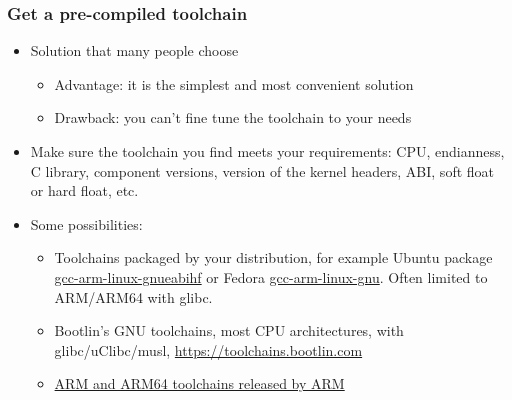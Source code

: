 \begin{frame}
  \frametitle{Get a pre-compiled toolchain}
  \begin{itemize}
  \item Solution that many people choose
    \begin{itemize}
    \item Advantage: it is the simplest and most convenient solution
    \item Drawback: you can't fine tune the toolchain to your needs
    \end{itemize}
  \item Make sure the toolchain you find meets your requirements: CPU,
    endianness, C library, component versions, version of the kernel
    headers, ABI, soft float or hard float, etc.
  \item Some possibilities:
    \begin{itemize}
    \item Toolchains packaged by your distribution, for example Ubuntu
      package
      \href{https://packages.ubuntu.com/gcc-arm-linux-gnueabihf}{gcc-arm-linux-gnueabihf}
      or Fedora
      \href{https://packages.fedoraproject.org/pkgs/cross-gcc/gcc-arm-linux-gnu/}{gcc-arm-linux-gnu}. Often
      limited to ARM/ARM64 with glibc.
    \item Bootlin's GNU toolchains, most CPU architectures, with
      glibc/uClibc/musl, \url{https://toolchains.bootlin.com}
    \item \href{https://developer.arm.com/tools-and-software/open-source-software/developer-tools/gnu-toolchain/downloads}
      {ARM and ARM64 toolchains released by ARM}
    \end{itemize}
  \end{itemize}
\end{frame}

